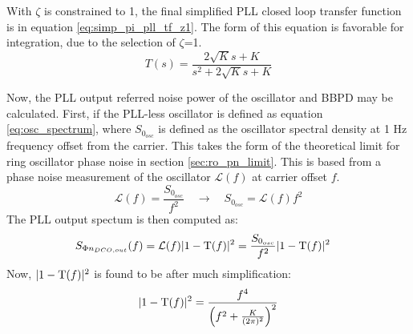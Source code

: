 			With $\zeta$ is constrained to 1, the final simplified PLL closed loop transfer function is in equation \ref{eq:simp_pi_pll_tf_z1}. The form of this equation is favorable for integration, due to the selection of $\zeta$=1.
			\begin{equation} \label{eq:simp_pi_pll_tf_z1}
				T(s) = \frac{2\sqrt{K}s + K }{s^2 + 2\sqrt{K}s + K}
			\end{equation}
			
			Now, the PLL output referred noise power of the oscillator and BBPD may be calculated. First, if the PLL-less oscillator is defined as equation \ref{eq:osc_spectrum}, where $S_{0_{osc}}$ is defined as the oscillator spectral density at 1 Hz frequency offset from the carrier. This takes the form of the theoretical limit for ring oscillator phase noise in section \ref{sec:ro_pn_limit}. This is based from a phase noise measurement of the oscillator $\mathcal{L}(f)$ at carrier offset $f$.
			\begin{equation}\label{eq:osc_spectrum} 
				\mathcal{L}(f) = \frac{S_{0_{osc}}}{f^2} \hspace{1em}\rightarrow \hspace{1em} S_{0_{osc}} = \mathcal{L}(f)f^2
			\end{equation} 
			The PLL output spectum is then computed as: 
			\begin{align}\label{eq:out_psd_dco_pll3} 
				S_{\Phi n_{DCO,out}}(f) &= \mathcal{L}(f)|1-\textnormal{T}(f)|^2  =  \frac{S_{0_{osc}}}{f^2}|1-\textnormal{T}(f)|^2  
			\end{align} Now, $|1-\textnormal{T}(f)|^2$ is found to be after much simplification:
			\begin{equation} |1-\textnormal{T}(f)|^2 =
				\frac{f^4}{\left(f^2+\frac{K}{(2\pi)^2}\right)^2} 
			\end{equation} 

